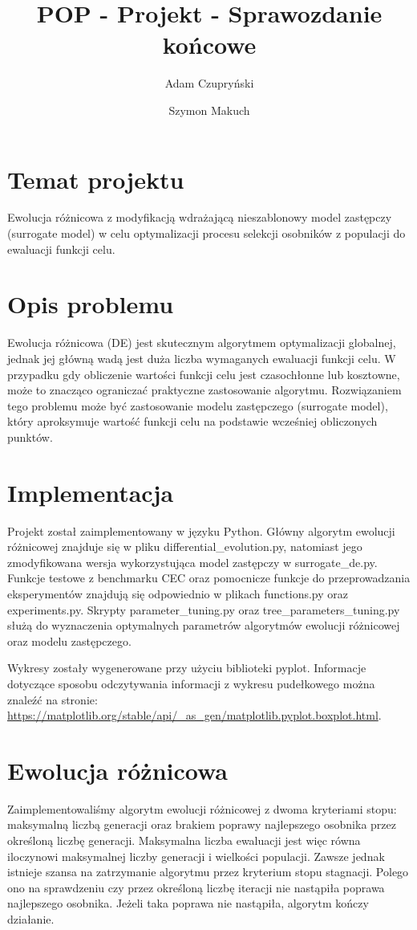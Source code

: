 \documentclass{article}
\title{POP - Projekt - Sprawozdanie końcowe}
\author{Adam Czupryński \and Szymon Makuch}
\begin{document}
\maketitle

\section{Temat projektu}
Ewolucja różnicowa z modyfikacją wdrażającą nieszablonowy model zastępczy (surrogate model) w celu optymalizacji procesu selekcji osobników z populacji do ewaluacji funkcji celu.

\section{Opis problemu}
Ewolucja różnicowa (DE) jest skutecznym algorytmem optymalizacji globalnej, jednak jej główną wadą jest duża liczba wymaganych ewaluacji funkcji celu. W przypadku gdy obliczenie wartości funkcji celu jest czasochłonne lub kosztowne, może to znacząco ograniczać praktyczne zastosowanie algorytmu. Rozwiązaniem tego problemu może być zastosowanie modelu zastępczego (surrogate model), który aproksymuje wartość funkcji celu na podstawie wcześniej obliczonych punktów.

\section{Implementacja}
Projekt został zaimplementowany w języku Python. Główny algorytm ewolucji różnicowej znajduje się w pliku differential\_evolution.py, natomiast jego zmodyfikowana wersja wykorzystująca model zastępczy w surrogate\_de.py. Funkcje testowe z benchmarku CEC oraz pomocnicze funkcje do przeprowadzania eksperymentów znajdują się odpowiednio w plikach functions.py oraz experiments.py. Skrypty parameter\_tuning.py oraz tree\_parameters\_tuning.py służą do wyznaczenia optymalnych parametrów algorytmów ewolucji różnicowej oraz modelu zastępczego.

Wykresy zostały wygenerowane przy użyciu biblioteki pyplot. Informacje dotyczące sposobu odczytywania informacji z wykresu pudełkowego można znaleźć na stronie: \url{https://matplotlib.org/stable/api/_as_gen/matplotlib.pyplot.boxplot.html}.

\section{Ewolucja różnicowa}
Zaimplementowaliśmy algorytm ewolucji różnicowej z dwoma kryteriami stopu: maksymalną liczbą generacji oraz brakiem poprawy najlepszego osobnika przez określoną liczbę generacji.
Maksymalna liczba ewaluacji jest więc równa iloczynowi maksymalnej liczby generacji i wielkości populacji. Zawsze jednak istnieje szansa na zatrzymanie algorytmu przez kryterium stopu stagnacji. Polego ono na sprawdzeniu czy przez określoną liczbę iteracji nie nastąpiła poprawa najlepszego osobnika. Jeżeli taka poprawa nie nastąpiła, algorytm kończy działanie.
\end{document}
